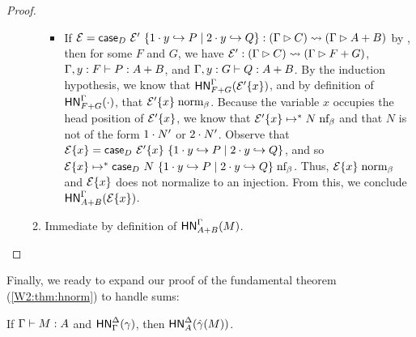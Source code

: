 \documentclass{article}
\begin{document}
\begin{proof}
\begin{itemize}
\begin{enumerate}
\begin{itemize}
      \item If $\mathcal{E} = \mathsf{case}_{D}\ \mathcal{E}'\ \{1\cdot y \hookrightarrow P \mid 2\cdot y \hookrightarrow Q\} : (\Gamma \rhd C) \leadsto (\Gamma \rhd A + B)$ by , then for some $F$ and $G$, we have $\mathcal{E}' : (\Gamma \rhd C) \leadsto (\Gamma \rhd F + G)$, $\Gamma, y:F \vdash P : A+B$, and $\Gamma, y:G \vdash Q : A+B$.
        By the induction hypothesis, we know that $\mathsf{HN}^{\Gamma}_{F + G}(\mathcal{E}'\{x\})$, and by definition of $\mathsf{HN}^{\Gamma}_{F + G}(\cdot)$, that $\mathcal{E}'\{x\} \mathrel{\text{norm}_\beta}$.
        Because the variable $x$ occupies the head position of $\mathcal{E}'\{x\}$, we know that $\mathcal{E}'\{x\} \mapsto^* N \mathrel{\text{nf}_\beta}$ and that $N$ is not of the form $1\cdot N'$ or $2\cdot N'$.
        Observe that $\mathcal{E}\{x\} = \mathsf{case}_{D}\ \mathcal{E}'\{x\}\ \{1\cdot y \hookrightarrow P \mid 2\cdot y \hookrightarrow Q\}$, and so $\mathcal{E}\{x\} \mapsto^* \mathsf{case}_{D}\ N\ \{1\cdot y \hookrightarrow P \mid 2\cdot y \hookrightarrow Q\} \mathrel{\text{nf}_\beta}$.
        Thus, $\mathcal{E}\{x\} \mathrel{\text{norm}_\beta}$ and $\mathcal{E}\{x\}$ does not normalize to an injection.
        From this, we conclude $\mathsf{HN}^{\Gamma}_{A+B}(\mathcal{E}\{x\})$.
      \end{itemize}
    \item Immediate by definition of $\mathsf{HN}^{\Gamma}_{A+B}(M)$.\qedhere
    \end{enumerate}
  \end{itemize}
\end{proof}

Finally, we ready to expand our proof of the fundamental theorem (\cref{W2:thm:hnorm}) to handle sums:

\begin{theorem}[FTLR]
  If $\Gamma \vdash M : A$ and $\mathsf{HN}^{\Delta}_{\Gamma}(\gamma)$, then $\mathsf{HN}^{\Delta}_{A}(\hat\gamma(M))$.
\end{theorem}
\end{document}
